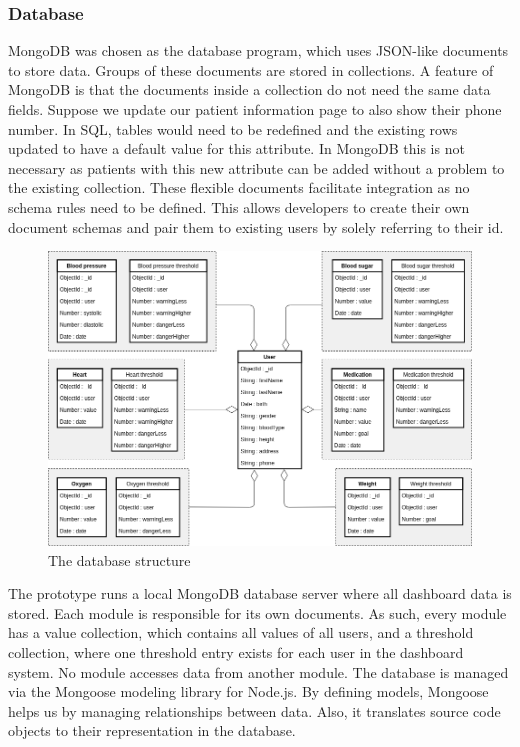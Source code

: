         \subsubsection{Database}

        MongoDB was chosen as the database program, which uses JSON-like documents to store data. Groups of these documents are stored in collections. A feature of MongoDB is that the documents inside a collection do not need the same data fields. Suppose we update our patient information page to also show their phone number. In SQL, tables would need to be redefined and the existing rows updated to have a default value for this attribute. In MongoDB this is not necessary as  patients with this new attribute can be added without a problem to the existing collection. These flexible documents facilitate integration as no schema rules need to be defined. This allows developers to create their own document schemas and pair them to existing users by solely referring to their id.

        \begin{figure}[!t]
            \centering
            \includegraphics[width=1.0\textwidth]{chapters/4_implementation/db}
            \caption{The database structure}\label{fig:db}
        \end{figure}

        The prototype runs a local MongoDB database server where all dashboard data is stored. Each module is responsible for its own documents. As such, every module has a value collection, which contains all values of all users, and a threshold collection, where one threshold entry exists for each user in the dashboard system. No module accesses data from another module. The database is managed via the Mongoose modeling library for Node.js. By defining models, Mongoose helps us by managing relationships between data. Also, it translates source code objects to their representation in the database.

